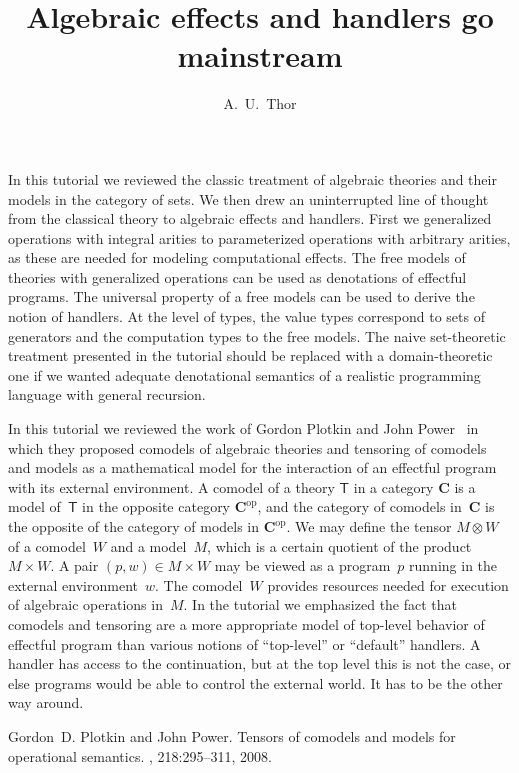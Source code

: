 \documentclass[a4paper,UKenglish]{dagrep-v2018}
\begin{document}
\subject{Report from Dagstuhl Seminar 18172}

\title{Algebraic effects and handlers go mainstream}

\author[1]{A.~U.~Thor}

\maketitle

\license

In this tutorial we reviewed the classic treatment of algebraic theories and
their models in the category of sets. We then drew an uninterrupted line of
thought from the classical theory to algebraic effects and handlers. First we
generalized operations with integral arities to parameterized operations with
arbitrary arities, as these are needed for modeling computational effects. The
free models of theories with generalized operations can be used as denotations
of effectful programs. The universal property of a free models can be used to
derive the notion of handlers. At the level of types, the value types correspond
to sets of generators and the computation types to the free models. The naive
set-theoretic treatment presented in the tutorial should be replaced with a
domain-theoretic one if we wanted adequate denotational semantics of a realistic
programming language with general recursion.


\license

In this tutorial we reviewed the work of Gordon Plotkin and John
Power~\cite{plotkin08:_tensor_comod_model_operat_seman} in which they proposed
comodels of algebraic theories and tensoring of comodels and models as a
mathematical model for the interaction of an effectful program with its external
environment. A comodel of a theory $\mathsf{T}$ in a category $\mathbf{C}$ is a
model of~$\mathsf{T}$ in the opposite category $\mathbf{C}^{\mathrm{op}}$, and
the category of comodels in~$\mathbf{C}$ is the opposite of the category of
models in $\mathbf{C}^{\mathrm{op}}$. We may define the tensor $M \otimes W$ of
a comodel~$W$ and a model~$M$, which is a certain quotient of the product
$M \times W$. A pair $(p, w) \in M \times W$ may be viewed as a program~$p$
running in the external environment~$w$. The comodel~$W$ provides resources
needed for execution of algebraic operations in~$M$. In the tutorial we
emphasized the fact that comodels and tensoring are a more appropriate model of
top-level behavior of effectful program than various notions of ``top-level'' or
``default'' handlers. A handler has access to the continuation, but at the top
level this is not the case, or else programs would be able to control the
external world. It has to be the other way around.


\begin{thebibliography}{10}

Gordon~D. Plotkin and John Power.
\newblock Tensors of comodels and models for operational semantics.
, 218:295--311,
  2008.

\end{thebibliography}
\end{document}
